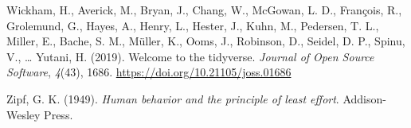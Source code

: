 \documentclass[
]{article}
\newlength{\cslhangindent}
\newlength{\cslentryspacingunit} %
\newenvironment{CSLReferences}[2] %
 {%
  \setlength{\parindent}{0pt}
  \ifodd #1
  \let\oldpar\par
  \def\par{\hangindent=\cslhangindent\oldpar}
  \fi
  \setlength{\parskip}{#2\cslentryspacingunit}
 }%
 {}
\begin{document}
\begin{CSLReferences}{1}{0}
\leavevmode{}%
Wickham, H., Averick, M., Bryan, J., Chang, W., McGowan, L. D.,
François, R., Grolemund, G., Hayes, A., Henry, L., Hester, J., Kuhn, M.,
Pedersen, T. L., Miller, E., Bache, S. M., Müller, K., Ooms, J.,
Robinson, D., Seidel, D. P., Spinu, V., \ldots{} Yutani, H. (2019).
Welcome to the tidyverse. \emph{Journal of Open Source Software},
\emph{4}(43), 1686. \url{https://doi.org/10.21105/joss.01686}

\leavevmode{}%
Zipf, G. K. (1949). \emph{Human behavior and the principle of least
effort}. Addison-Wesley Press.

\end{CSLReferences}
\end{document}
